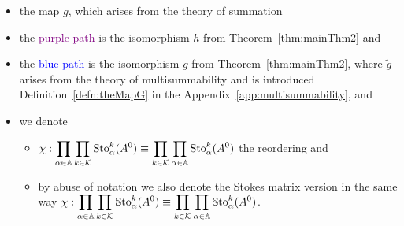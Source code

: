 \begin{itemize}
  \item the map $g$, which arises from the theory of summation
  \item the \textcolor{purple}{purple path} is the isomorphism $h$ from
    Theorem~\ref{thm:mainThm2} and
  \item the \textcolor{blue}{blue path} is the isomorphism $g$ from
    Theorem~\ref{thm:mainThm2}, where $\tilde g$ arises from the theory of
    multisummability and is introduced Definition~\ref{defn:theMapG} in the
    Appendix~\ref{app:multisummability}, and
  \item we denote
    \begin{itemize}
      \item $\chi:\displaystyle \prod_{\alpha\in\mathbb{A}}\prod_{k\in\mathcal{K}}\operatorname{Sto}_\alpha^k(A^0)
        \equiv\displaystyle \prod_{k\in\mathcal{K}}\prod_{\alpha\in\mathbb{A}}\operatorname{Sto}_\alpha^k(A^0)$
        the reordering and
      \item by abuse of notation we also denote the Stokes matrix version in
        the same way
        $\chi:\displaystyle \prod_{\alpha\in\mathbb{A}}\prod_{k\in\mathcal{K}}\operatorname{\mathbb{S}to}_\alpha^k(A^0)
        \equiv\displaystyle
        \prod_{k\in\mathcal{K}}\prod_{\alpha\in\mathbb{A}}\operatorname{\mathbb{S}to}_\alpha^k(A^0)$.
    \end{itemize}
\end{itemize}

